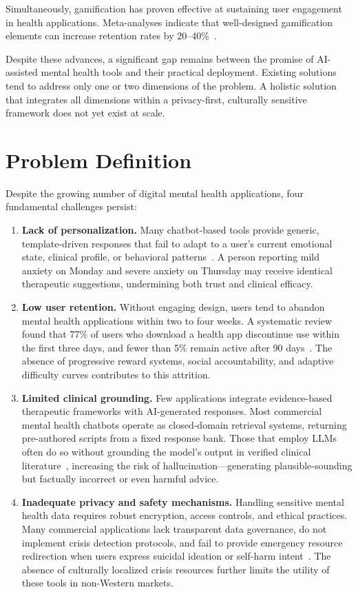 \documentclass[12pt,a4paper,oneside,openany]{report}
\begin{document}
Simultaneously, gamification has proven effective at sustaining user engagement in health applications. Meta-analyses indicate that well-designed gamification elements can increase retention rates by 20--40\%~\cite{hamari2016gamification}.

Despite these advances, a significant gap remains between the promise of AI-assisted mental health tools and their practical deployment. Existing solutions tend to address only one or two dimensions of the problem. A holistic solution that integrates all dimensions within a privacy-first, culturally sensitive framework does not yet exist at scale.

\section{Problem Definition}
\label{sec:problem}

Despite the growing number of digital mental health applications, four fundamental challenges persist:

\begin{enumerate}[nosep]
\item \textbf{Lack of personalization.} Many chatbot-based tools provide generic, template-driven responses that fail to adapt to a user's current emotional state, clinical profile, or behavioral patterns~\cite{who2021mental}. A person reporting mild anxiety on Monday and severe anxiety on Thursday may receive identical therapeutic suggestions, undermining both trust and clinical efficacy.
\item \textbf{Low user retention.} Without engaging design, users tend to abandon mental health applications within two to four weeks. A systematic review found that 77\% of users who download a health app discontinue use within the first three days, and fewer than 5\% remain active after 90 days~\cite{hamari2016gamification,chen2020retention}. The absence of progressive reward systems, social accountability, and adaptive difficulty curves contributes to this attrition.
\item \textbf{Limited clinical grounding.} Few applications integrate evidence-based therapeutic frameworks with AI-generated responses. Most commercial mental health chatbots operate as closed-domain retrieval systems, returning pre-authored scripts from a fixed response bank. Those that employ LLMs often do so without grounding the model's output in verified clinical literature~\cite{kumar2023mental}, increasing the risk of hallucination---generating plausible-sounding but factually incorrect or even harmful advice.
\item \textbf{Inadequate privacy and safety mechanisms.} Handling sensitive mental health data requires robust encryption, access controls, and ethical practices. Many commercial applications lack transparent data governance, do not implement crisis detection protocols, and fail to provide emergency resource redirection when users express suicidal ideation or self-harm intent~\cite{guo2024llmmentalhealth}. The absence of culturally localized crisis resources further limits the utility of these tools in non-Western markets.
\end{enumerate}
\end{document}
